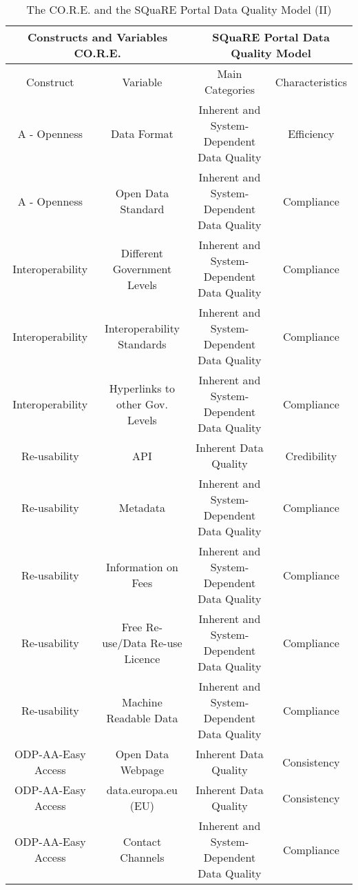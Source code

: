 \documentclass[a4paper, twoside]{report}
\begin{document}
\begin{table}[htbp]
  \centering
  \caption{The CO.R.E. and the SQuaRE Portal Data Quality Model (II)}
   \tabcolsep=0.60cm
	\renewcommand{\arraystretch}{2}
	\begin{adjustbox}{max width=\linewidth}
    \begin{tabular}{cc|cc}
    \hline
    \multicolumn{2}{c|}{Constructs and Variables CO.R.E.} & \multicolumn{2}{c}{SQuaRE Portal Data Quality Model} \\
    \hline
    Construct & Variable & Main Categories & Characteristics \\
    \hline
    A - Openness & Data Format & Inherent and System-Dependent Data Quality & Efficiency \\
    \rowcolor[rgb]{ .851,  .851,  .851} A - Openness & Open Data Standard & Inherent and System-Dependent Data Quality & Compliance \\
    Interoperability & Different Government Levels & Inherent and System-Dependent Data Quality & Compliance \\
    \rowcolor[rgb]{ .851,  .851,  .851} Interoperability & Interoperability Standards & Inherent and System-Dependent Data Quality & Compliance \\
    \rowcolor[rgb]{ .851,  .851,  .851} Interoperability & Hyperlinks to other Gov. Levels & Inherent and System-Dependent Data Quality & Compliance \\
    Re-usability & API   & Inherent Data Quality & Credibility \\
    Re-usability & Metadata & Inherent and System-Dependent Data Quality & Compliance \\
    Re-usability & Information on Fees & Inherent and System-Dependent Data Quality & Compliance \\
    \rowcolor[rgb]{ .851,  .851,  .851} Re-usability & Free Re-use/Data Re-use Licence & Inherent and System-Dependent Data Quality & Compliance \\
    \rowcolor[rgb]{ .851,  .851,  .851} Re-usability & Machine Readable Data & Inherent and System-Dependent Data Quality & Compliance \\
    ODP-AA-Easy Access & Open Data Webpage & Inherent Data Quality & Consistency \\
    ODP-AA-Easy Access & data.europa.eu (EU) & Inherent Data Quality & Consistency \\
    ODP-AA-Easy Access & Contact Channels & Inherent and System-Dependent Data Quality & Compliance \\

\end{tabular}
\end{adjustbox}
\end{table}
\end{document}
